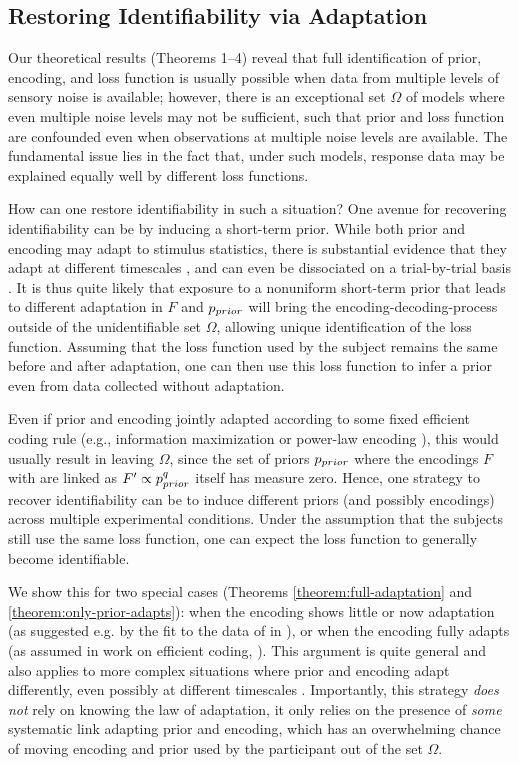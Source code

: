 \subsection{Restoring Identifiability via Adaptation}\label{sec:recover-adaptation}

Our theoretical results (Theorems 1--4) reveal that full identification of prior, encoding, and loss function is usually possible when data from multiple levels of sensory noise is available; however, there is an exceptional set $\Omega$ of models where even multiple noise levels may not be sufficient, such that prior and loss function are confounded even when observations at multiple noise levels are available. The fundamental issue lies in the fact that, under such models, response data may be explained equally well by different loss functions.

How can one restore identifiability  in such a situation?
One avenue for recovering identifiability can be by inducing a short-term prior.
While both prior and encoding may adapt to stimulus statistics, there is substantial evidence that they adapt at different timescales \citep{Fritsche2020ABA, hahn2024unifying}, and can even be dissociated on a trial-by-trial basis \citep{Fritsche2020ABA}.
It is thus quite likely that exposure to a nonuniform short-term prior that leads to different adaptation in $F$ and $p_{prior}$ will bring the encoding-decoding-process outside of the unidentifiable set $\Omega$, allowing unique identification of the loss function.
Assuming that the loss function used by the subject remains the same before and after adaptation, one can then use this loss function to infer a prior even from data collected without adaptation.

Even if prior and encoding jointly adapted according to some fixed efficient coding rule (e.g., information maximization \citep{Wei2015ABO} or power-law encoding \citep{Morais2018PowerlawEN}), this would usually result in leaving $\Omega$, since the set of priors $p_{prior}$ where the encodings $F$ with are linked as $F' \propto p_{prior}^q$ itself has measure zero.
Hence, one strategy to recover identifiability can be to induce different priors (and possibly encodings) across multiple experimental conditions. Under the assumption that the subjects still use the same loss function, one can expect the loss function to generally become identifiable.


We show this for two special cases (Theorems \ref{theorem:full-adaptation} and \ref{theorem:only-prior-adapts}): when the encoding shows little or now adaptation (as suggested e.g. by the fit to the data of \cite{gekas2013complexityas} in \cite{hahn2024unifying}), or when the encoding fully adapts (as assumed in work on efficient coding, \citep[e.g.][]{Wei2015ABO, Morais2018PowerlawEN}).
This argument is quite general and also applies to more complex situations where prior and encoding adapt differently, even possibly at different timescales \citep{Fritsche2020ABA}.
Importantly, this strategy \emph{does not} rely on knowing the law of adaptation, it only relies on the presence of \emph{some} systematic link adapting prior and encoding, which has an overwhelming chance of moving encoding and prior used by the participant out of the set $\Omega$.


